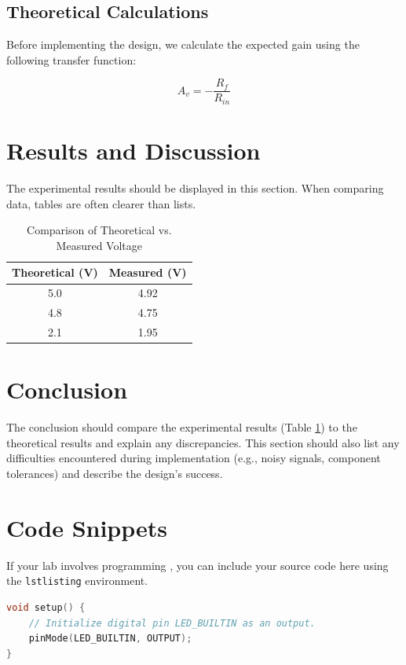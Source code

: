 \documentclass{article}
\begin{document}
\subsection{Theoretical Calculations}
Before implementing the design, we calculate the expected gain using the following transfer function:

\[ A_v = -\frac{R_f}{R_{in}} \]
\section{Results and Discussion}
The experimental results should be displayed in this section. When comparing data, tables are often clearer than lists.

\begin{table}[ht]
    \centering
    \caption{Comparison of Theoretical vs. Measured Voltage}
    \begin{tabular}{|c|c|} %
        \hline
        Theoretical (V) & Measured (V) \\
        \hline
        5.0 & 4.92 \\ %
        4.8 & 4.75 \\
        2.1 & 1.95 \\
        \hline
    \end{tabular}
    \label{tab:data}
\end{table}

\section{Conclusion}
The conclusion should compare the experimental results (Table \ref{tab:data}) to the theoretical results and explain any discrepancies. This section should also list any difficulties encountered during implementation (e.g., noisy signals, component tolerances) and describe the design’s success.

\newpage %
\appendix
\section{Code Snippets}
If your lab involves programming , you can include your source code here using the \texttt{lstlisting} environment.

\begin{lstlisting}[language=C++, caption=Sample Initialization Code]
void setup() {
    // Initialize digital pin LED_BUILTIN as an output.
    pinMode(LED_BUILTIN, OUTPUT);
}
\end{lstlisting}
\end{document}
